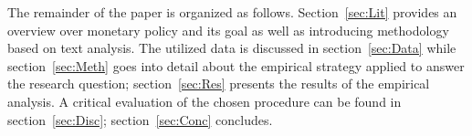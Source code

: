 The remainder of the paper is organized as follows. Section~\ref{sec:Lit} provides an overview over monetary policy and its goal as well as introducing methodology based on text analysis. The utilized data is discussed in section~\ref{sec:Data} while section~\ref{sec:Meth} goes into detail about the empirical strategy applied to answer the research question; section~\ref{sec:Res} presents the results of the empirical analysis. A critical evaluation of the chosen procedure can be found in section~\ref{sec:Disc}; section~\ref{sec:Conc} concludes.
%
%